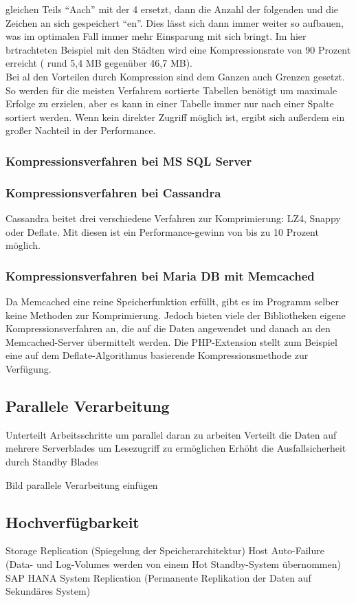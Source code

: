 \documentclass[a4paper, 12pt]{scrartcl}
\begin{document}
gleichen Teils "`Aach"' mit der 4 ersetzt, dann die Anzahl der folgenden und die Zeichen an sich gespeichert "`en"'. Dies lässt sich dann immer weiter so aufbauen, was im optimalen Fall immer mehr Einsparung mit sich bringt. Im hier brtrachteten Beispiel mit den Städten wird eine Kompressionsrate von 90 Prozent erreicht ( rund 5,4 MB gegenüber 46,7 MB). \\ Bei al den Vorteilen durch Kompression sind dem Ganzen auch Grenzen gesetzt. So werden für die meisten Verfahrem sortierte Tabellen benötigt um maximale Erfolge zu erzielen, aber es kann in einer Tabelle immer nur nach einer Spalte sortiert werden. Wenn kein direkter Zugriff möglich ist, ergibt sich außerdem ein großer Nachteil in der Performance.
\newpage
\subsubsection{Kompressionsverfahren bei MS SQL Server}

\subsubsection{Kompressionsverfahren bei Cassandra}
Cassandra beitet drei verschiedene Verfahren zur Komprimierung: LZ4, Snappy oder Deflate. Mit diesen ist ein Performance-gewinn von bis zu 10 Prozent möglich. 
\subsubsection{Kompressionsverfahren bei Maria DB mit Memcached}
Da Memcached eine reine Speicherfunktion erfüllt, gibt es im Programm selber keine Methoden zur Komprimierung. Jedoch bieten viele der Bibliotheken eigene Kompressionsverfahren an, die auf die Daten angewendet und danach an den Memcached-Server übermittelt werden. Die PHP-Extension stellt zum Beispiel eine auf dem Deflate-Algorithmus basierende Kompressionsmethode zur Verfügung.
\newpage

\subsection{Parallele Verarbeitung}
Unterteilt Arbeitsschritte um parallel daran zu arbeiten
Verteilt die Daten auf mehrere Serverblades um Lesezugriff zu ermöglichen
Erhöht die Ausfallsicherheit durch Standby Blades

Bild parallele Verarbeitung einfügen 


\newpage 
\subsection{Hochverfügbarkeit}
Storage Replication (Spiegelung der Speicherarchitektur)
Host Auto-Failure (Data- und Log-Volumes werden von einem Hot Standby-System übernommen)
SAP HANA System Replication (Permanente Replikation der Daten auf Sekundäres System)
\end{document}
